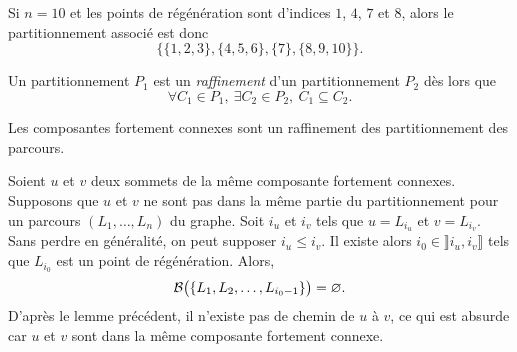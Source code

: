 \begin{exm}
	Si  $n = 10$\/ et les points de régénération sont d'indices $1$, $4$, $7$\/ et $8$, alors le partitionnement associé est donc \[
		\Big\{ \{1,2,3\}, \{4,5,6\}, \{7\}, \{8,9, 10\} \Big\}
	.\]
\end{exm}

\begin{defn}
	Un partitionnement $P_1$\/ est un \textit{raffinement} d'un partitionnement $P_2$\/ dès lors que \[
		\forall C_1 \in P_1,\: \exists C_2 \in P_2,\: C_1 \subseteq C_2
	.\]
\end{defn}

\begin{prop}
	Les composantes fortement connexes sont un raffinement des partitionnement des parcours.
\end{prop}

\begin{prv}
	Soient $u$\/ et $v$\/ deux sommets de la même composante fortement connexes.
	Supposons que $u$\/ et $v$\/ ne sont pas dans la même partie du partitionnement pour un parcours $(L_1, \ldots, L_n)$\/ du graphe.
	Soit $i_u$\/ et $i_v$\/ tels que $u = L_{i_u}$\/ et $v = L_{i_v}$. Sans perdre en généralité, on peut supposer $i_u \le i_v$.
	Il existe alors $i_0 \in {\rrbracket i_u, i_v \rrbracket}$\/ tels que $L_{i_0}$\/ est un point de régénération. Alors, \[
		\mathcal{B}\big(\{L_1, L_2, \ldots, L_{i_0 - 1}\}\big) = \varnothing
	.\]
	D'après le lemme précédent, il n'existe pas de chemin de $u$\/ à $v$, ce qui est absurde car $u$\/ et $v$\/ sont dans la même composante fortement connexe.
\end{prv}
